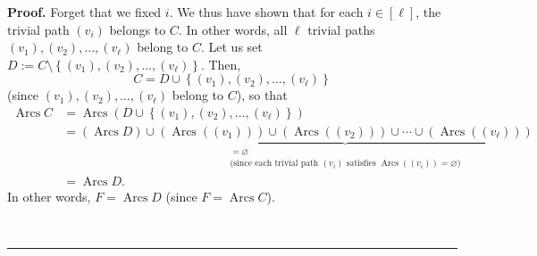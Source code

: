 \documentclass[numbers=enddot,12pt,final,onecolumn,notitlepage]{scrartcl}%
\numberwithin{exer}{section}
\theoremstyle{definition}
\newenvironment{proof}[1][Proof]{\noindent\textbf{#1.} }{\ \rule{0.5em}{0.5em}}
\newenvironment{verlong}{}{}
\begin{document}
\begin{verlong}
\begin{proof}
Forget that we fixed $i$. We thus have shown that for each $i\in\left[
\ell\right]  $, the trivial path $\left(  v_{i}\right)  $ belongs to $C$. In
other words, all $\ell$ trivial paths $\left(  v_{1}\right)  ,\left(
v_{2}\right)  ,\ldots,\left(  v_{\ell}\right)  $ belong to $C$. Let us set
$D:=C\setminus\left\{  \left(  v_{1}\right)  ,\left(  v_{2}\right)
,\ldots,\left(  v_{\ell}\right)  \right\}  $. Then,%
\[
C=D\cup\left\{  \left(  v_{1}\right)  ,\left(  v_{2}\right)  ,\ldots,\left(
v_{\ell}\right)  \right\}
\]
(since $\left(  v_{1}\right)  ,\left(  v_{2}\right)  ,\ldots,\left(  v_{\ell
}\right)  $ belong to $C$), so that%
\begin{align*}
\operatorname*{Arcs}C  &  =\operatorname*{Arcs}\left(  D\cup\left\{  \left(
v_{1}\right)  ,\left(  v_{2}\right)  ,\ldots,\left(  v_{\ell}\right)
\right\}  \right) \\
&  =\left(  \operatorname*{Arcs}D\right)  \cup\underbrace{\left(
\operatorname*{Arcs}\left(  \left(  v_{1}\right)  \right)  \right)
\cup\left(  \operatorname*{Arcs}\left(  \left(  v_{2}\right)  \right)
\right)  \cup\cdots\cup\left(  \operatorname*{Arcs}\left(  \left(  v_{\ell
}\right)  \right)  \right)  }_{\substack{=\varnothing\\\text{(since each
trivial path }\left(  v_{i}\right)  \text{ satisfies }\operatorname*{Arcs}%
\left(  \left(  v_{i}\right)  \right)  =\varnothing\text{)}}}\\
&  =\operatorname*{Arcs}D.
\end{align*}
In other words, $F=\operatorname*{Arcs}D$ (since $F=\operatorname*{Arcs}C$).


\end{proof}
\end{verlong}
\end{document}
